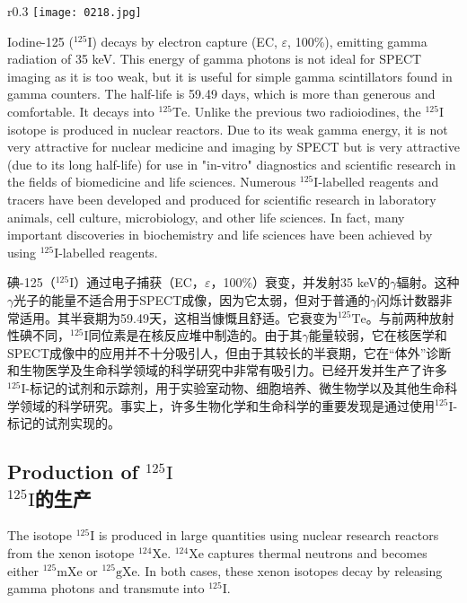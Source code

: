 \documentclass[dvipsnames, svgnames,a4paper,11pt]{article}
\begin{document}
\begin{wrapfigure}{r}{0.3\textwidth}
    \centering
    \texttt{[image: 0218.jpg]}
     \label{fig272}
\end{wrapfigure}

Iodine-125 (\(\mathrm{^{125}I}\)) decays by electron capture (EC, \(\varepsilon\), 100\%), emitting gamma radiation of 35 keV. This energy of gamma photons is not ideal for SPECT imaging as it is too weak, but it is useful for simple gamma scintillators found in gamma counters. The half-life is 59.49 days, which is more than generous and comfortable. It decays into \(\mathrm{^{125}Te}\). Unlike the previous two radioiodines, the \(\mathrm{^{125}I}\) isotope is produced in nuclear reactors. Due to its weak gamma energy, it is not very attractive for nuclear medicine and imaging by SPECT but is very attractive (due to its long half-life) for use in "in-vitro" diagnostics and scientific research in the fields of biomedicine and life sciences. Numerous \(\mathrm{^{125}I}\)-labelled reagents and tracers have been developed and produced for scientific research in laboratory animals, cell culture, microbiology, and other life sciences. In fact, many important discoveries in biochemistry and life sciences have been achieved by using \(\mathrm{^{125}I}\)-labelled reagents.

碘-125（\(\mathrm{^{125}I}\)）通过电子捕获（EC，\(\varepsilon\)，100\%）衰变，并发射35 keV的$\gamma$辐射。这种$\gamma$光子的能量不适合用于SPECT成像，因为它太弱，但对于普通的$\gamma$闪烁计数器非常适用。其半衰期为59.49天，这相当慷慨且舒适。它衰变为\(\mathrm{^{125}Te}\)。与前两种放射性碘不同，\(\mathrm{^{125}I}\)同位素是在核反应堆中制造的。由于其$\gamma$能量较弱，它在核医学和SPECT成像中的应用并不十分吸引人，但由于其较长的半衰期，它在“体外”诊断和生物医学及生命科学领域的科学研究中非常有吸引力。已经开发并生产了许多\(\mathrm{^{125}I}\)-标记的试剂和示踪剂，用于实验室动物、细胞培养、微生物学以及其他生命科学领域的科学研究。事实上，许多生物化学和生命科学的重要发现是通过使用\(\mathrm{^{125}I}\)-标记的试剂实现的。



\subsection{Production of \(\mathrm{^{125}I}\)\\ \(\mathrm{^{125}I}\)的生产}

The isotope \(\mathrm{^{125}I}\) is produced in large quantities using nuclear research reactors from the xenon isotope \(\mathrm{^{124}Xe}\). \(\mathrm{^{124}Xe}\) captures thermal neutrons and becomes either \(\mathrm{^{125}mXe}\) or \(\mathrm{^{125}gXe}\). In both cases, these xenon isotopes decay by releasing gamma photons and transmute into \(\mathrm{^{125}I}\).
\end{document}
